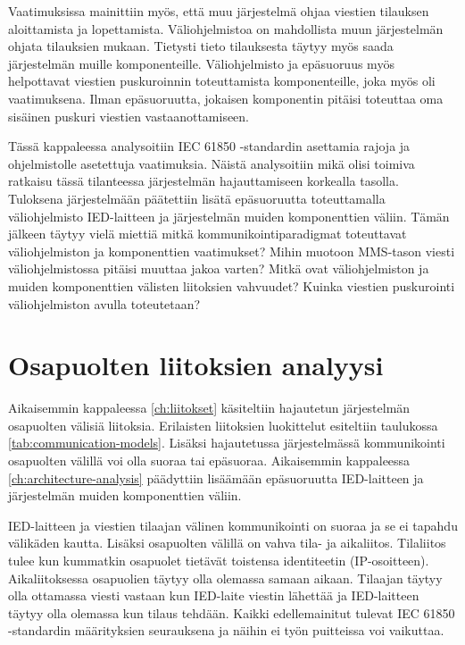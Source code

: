 Vaatimuksissa mainittiin myös, että muu järjestelmä ohjaa viestien tilauksen aloittamista ja lopettamista. Väliohjelmistoa on mahdollista muun järjestelmän ohjata tilauksien mukaan. Tietysti tieto tilauksesta täytyy myös saada järjestelmän muille komponenteille. Väliohjelmisto ja epäsuoruus myös helpottavat viestien puskuroinnin toteuttamista komponenteille, joka myös oli vaatimuksena. Ilman epäsuoruutta, jokaisen komponentin pitäisi toteuttaa oma sisäinen puskuri viestien vastaanottamiseen.

Tässä kappaleessa analysoitiin IEC 61850 -standardin asettamia rajoja ja ohjelmistolle asetettuja vaatimuksia. Näistä analysoitiin mikä olisi toimiva ratkaisu tässä tilanteessa järjestelmän hajauttamiseen korkealla tasolla. Tuloksena järjestelmään päätettiin lisätä epäsuoruutta toteuttamalla väliohjelmisto IED-laitteen ja järjestelmän muiden komponenttien väliin. Tämän jälkeen täytyy vielä miettiä mitkä kommunikointiparadigmat toteuttavat väliohjelmiston ja komponenttien vaatimukset? Mihin muotoon MMS-tason viesti väliohjelmistossa pitäisi muuttaa jakoa varten? Mitkä ovat väliohjelmiston ja muiden komponenttien välisten liitoksien vahvuudet? Kuinka viestien puskurointi väliohjelmiston avulla toteutetaan?


\section{Osapuolten liitoksien analyysi}
Aikaisemmin kappaleessa \ref{ch:liitokset} käsiteltiin hajautetun järjestelmän osapuolten välisiä liitoksia. Erilaisten liitoksien luokittelut esiteltiin taulukossa \ref{tab:communication-models}. Lisäksi hajautetussa järjestelmässä kommunikointi osapuolten välillä voi olla suoraa tai epäsuoraa. Aikaisemmin kappaleessa \ref{ch:architecture-analysis} päädyttiin lisäämään epäsuoruutta IED-laitteen ja järjestelmän muiden komponenttien väliin.

IED-laitteen ja viestien tilaajan välinen kommunikointi on suoraa ja se ei tapahdu välikäden kautta. Lisäksi osapuolten välillä on vahva tila- ja aikaliitos. Tilaliitos tulee kun kummatkin osapuolet tietävät toistensa identiteetin (IP-osoitteen). Aikaliitoksessa osapuolien täytyy olla olemassa samaan aikaan. Tilaajan täytyy olla ottamassa viesti vastaan kun IED-laite viestin lähettää ja IED-laitteen täytyy olla olemassa kun tilaus tehdään. Kaikki edellemainitut tulevat IEC 61850 -standardin määrityksien seurauksena ja näihin ei työn puitteissa voi vaikuttaa.

